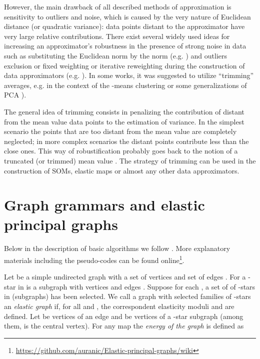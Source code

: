 \documentclass[graybox]{archivesofdatascience}
\begin{document}
However, the main drawback of all described methods of approximation is sensitivity to outliers and noise, which is caused by the very nature of Euclidean distance (or quadratic variance): data points distant to the approximator have very large relative contributions. There exist several widely used ideas for increasing an approximator's robustness in the presence of strong noise in data such as substituting the Euclidean norm by the  norm (e.g. \citet{Ding2006, hauberg2014}) and outliers exclusion or fixed weighting or iterative reweighting during the construction of data approximators (e.g. \citet{Xu1995,allende2004robust,kohonen2001self}). In some works, it was suggested to utilize ``trimming'' averages, e.g. in the context of the -means clustering or some generalizations of PCA \citet{cuesta1997,hauberg2014}).

The general idea of trimming consists in penalizing the contribution of distant from the mean value data points to the estimation of variance. In the simplest scenario the points that are too distant from the mean value are completely neglected; in more complex scenarios the distant points contribute less than the close ones. This way of robustification probably goes back to the notion of a truncated (or trimmed) mean value \citet{Huber1981}. The strategy of trimming can be used in the construction of SOMs, elastic maps or almost any other data approximators.



\section{Graph grammars and elastic principal graphs}
\label{GORBANsec:2}
Below in the description of basic algorithms we follow \citep{gorban2007topological}. More explanatory materials including the pseudo-codes can be found online\footnote{\url{https://github.com/auranic/Elastic-principal-graphs/wiki}}.

Let  be a simple undirected graph with a set of vertices  and
set of edges . For  a -star in  is a subgraph
with  vertices  and  edges . Suppose for each , a
set of  of -stars in  (subgraphs) has been selected. We call a graph
 with selected families of -stars  an {\it elastic graph}
if, for all  and , the
correspondent elasticity moduli  and  are defined. Let   be vertices of an
edge  and  be vertices
of a -star subgraph  (among them,  is the
central vertex).
 For any map  the {\it energy of the
graph} is defined as
\end{document}
